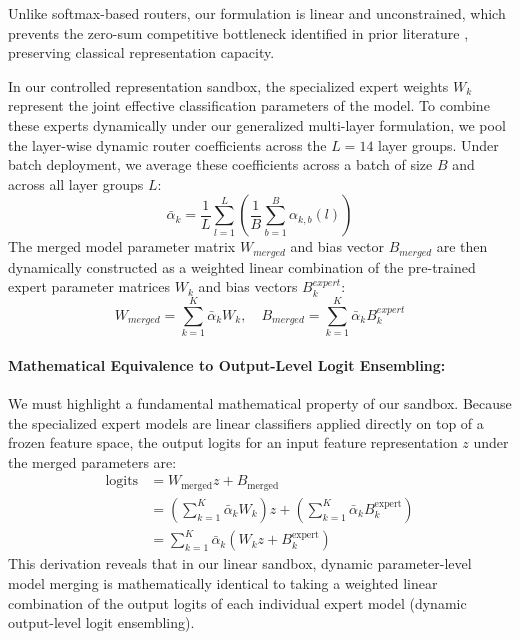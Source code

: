Unlike softmax-based routers, our formulation is linear and unconstrained, which prevents the
zero-sum competitive bottleneck identified in prior literature \cite{trial5_submission5}, preserving
classical representation capacity. 

In our controlled representation sandbox, the specialized expert weights $W_k$ represent the joint
effective classification parameters of the model. To combine these experts dynamically under our generalized multi-layer formulation, we pool the layer-wise dynamic router coefficients across the $L=14$ layer groups. Under batch deployment, we average these coefficients across a batch of size $B$ and across all layer groups $L$:
\begin{equation}
\bar{\alpha}_k = \frac{1}{L} \sum_{l=1}^L \left( \frac{1}{B} \sum_{b=1}^B \alpha_{k, b}(l) \right)
\label{eq:batch_coeff}
\end{equation}
The merged model parameter matrix $W_{merged}$ and bias vector $B_{merged}$ are then dynamically
constructed as a weighted linear combination of the pre-trained expert parameter matrices $W_k$ and
bias vectors $B^{expert}_k$:
\begin{equation}
W_{merged} = \sum_{k=1}^K \bar{\alpha}_k W_k, \quad B_{merged} = \sum_{k=1}^K \bar{\alpha}_k
B^{expert}_k
\label{eq:merging_sum}
\end{equation}

\paragraph{Mathematical Equivalence to Output-Level Logit Ensembling:}
We must highlight a fundamental mathematical property of our sandbox. Because the specialized
expert models are linear classifiers applied directly on top of a frozen feature space, the output
logits for an input feature representation $z$ under the merged parameters are:
\begin{align}
\text{logits} &= W_{\text{merged}} z + B_{\text{merged}} \nonumber \\
&= \left( \sum_{k=1}^K \bar{\alpha}_k W_k \right) z + \left( \sum_{k=1}^K \bar{\alpha}_k
B^{\text{expert}}_k \right) \nonumber \\
&= \sum_{k=1}^K \bar{\alpha}_k \left( W_k z + B^{\text{expert}}_k \right)
\label{eq:logit_equivalence}
\end{align}
This derivation reveals that in our linear sandbox, dynamic parameter-level model merging is
mathematically identical to taking a weighted linear combination of the output logits of each
individual expert model (dynamic output-level logit ensembling). 

